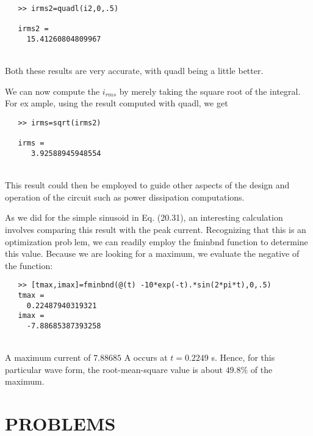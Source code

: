 \begin{verbatim}
   >> irms2=quadl(i2,0,.5)
   
   irms2 =
     15.41260804809967
\end{verbatim}\\
Both these results are very accurate, with quadl being a little better.

We can now compute the $i_{rms}$ by merely taking the square root of the integral. For example, using the result computed with quadl, we get

\begin{verbatim}
   >> irms=sqrt(irms2)
   
   irms =
      3.92588945948554
\end{verbatim}\\
This result could then be employed to guide other aspects of the design and operation of the
circuit such as power dissipation computations.

As we did for the simple sinusoid in Eq. (20.31), an interesting calculation involves
comparing this result with the peak current. Recognizing that this is an optimization problem, we can readily employ the fminbnd function to determine this value. Because we are
looking for a maximum, we evaluate the negative of the function:

\begin{verbatim}
   >> [tmax,imax]=fminbnd(@(t) -10*exp(-t).*sin(2*pi*t),0,.5)
   tmax =
     0.22487940319321
   imax =
     -7.88685387393258
\end{verbatim}\\
A maximum current of $7.88685$ A occurs at $t = 0.2249$ s. Hence, for this particular wave
form, the root-mean-square value is about $49.8\%$ of the maximum.

\section*{PROBLEMS} \hline

